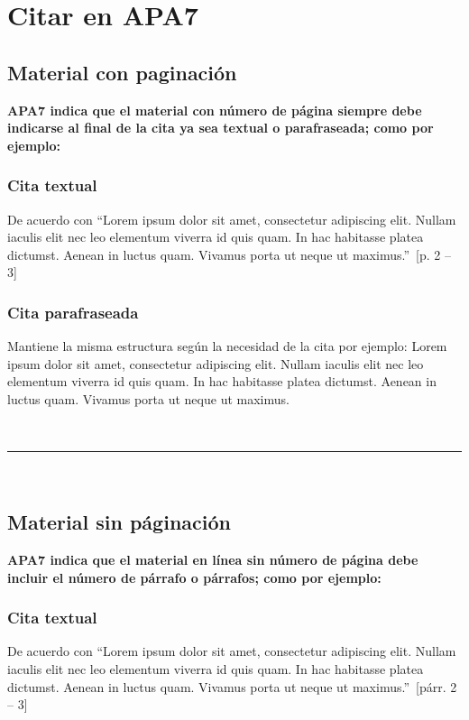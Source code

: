 \documentclass[stu, 12pt, letterpaper, donotrepeattitle, floatsintext, natbib]{apa7}
\begin{document}

\section{\large Citar en APA7}

\subsection{Material con paginación}
\noindent \textbf{APA7 indica que el material con número de página siempre debe indicarse al final de la cita ya sea textual o parafraseada; como por ejemplo:} 
\subsubsection{Cita textual}
De acuerdo con  ``Lorem ipsum dolor sit amet, consectetur adipiscing elit. Nullam iaculis elit nec leo elementum viverra id quis quam. In hac habitasse platea dictumst. Aenean in luctus quam. Vivamus porta ut neque ut maximus.''~[p. 2 -- 3]

\subsubsection{Cita parafraseada}
Mantiene la misma estructura según la necesidad de la cita por ejemplo:
Lorem ipsum dolor sit amet, consectetur adipiscing elit. Nullam iaculis elit nec leo elementum viverra id quis quam. In hac habitasse platea dictumst. Aenean in luctus quam. Vivamus porta ut neque ut maximus.  

\mbox{}\\ \hrule \mbox{}\\

\subsection{Material sin páginación}
\noindent \textbf{APA7 indica que el material en línea sin número de página debe incluir el número de párrafo o párrafos; como por ejemplo:}
\subsubsection{Cita textual}
 De acuerdo con  ``Lorem ipsum dolor sit amet, consectetur adipiscing elit. Nullam iaculis elit nec leo elementum viverra id quis quam. In hac habitasse platea dictumst. Aenean in luctus quam. Vivamus porta ut neque ut maximus.''~[párr. 2 -- 3]
\end{document}
